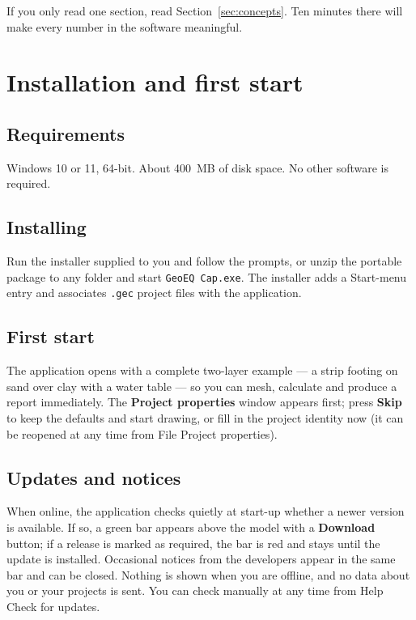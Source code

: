 \documentclass[11pt,a4paper]{article}
\newcommand{\ui}[1]{\textsf{\textbf{#1}}}
\newcommand{\menu}[1]{\textsf{#1}}
\begin{document}
\begin{tip}
If you only read one section, read Section~\ref{sec:concepts}. Ten minutes there will make every number in the software meaningful.
\end{tip}

\section{Installation and first start}

\subsection{Requirements}
Windows 10 or 11, 64-bit. About 400~MB of disk space. No other software is required.

\subsection{Installing}
Run the installer supplied to you and follow the prompts, or unzip the portable package to any folder and start \texttt{GeoEQ Cap.exe}. The installer adds a Start-menu entry and associates \texttt{.gec} project files with the application.

\subsection{First start}
The application opens with a complete two-layer example --- a strip footing on sand over clay with a water table --- so you can mesh, calculate and produce a report immediately. The \ui{Project properties} window appears first; press \ui{Skip} to keep the defaults and start drawing, or fill in the project identity now (it can be reopened at any time from \menu{File \textbar{} Project properties}).

\subsection{Updates and notices}
When online, the application checks quietly at start-up whether a newer version is available. If so, a green bar appears above the model with a \ui{Download} button; if a release is marked as required, the bar is red and stays until the update is installed. Occasional notices from the developers appear in the same bar and can be closed. Nothing is shown when you are offline, and no data about you or your projects is sent. You can check manually at any time from \menu{Help \textbar{} Check for updates}.
\end{document}
